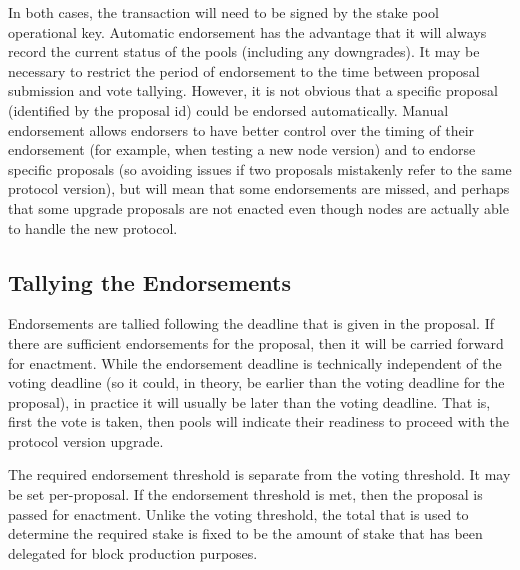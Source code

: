 In both cases, the transaction will need to be signed by the stake pool operational key.  Automatic endorsement has the advantage that it will always record the
current status of the pools (including any downgrades).  It may be necessary to restrict the period of endorsement to the time between proposal submission and vote tallying.
However, it is not obvious that a specific proposal (identified by the proposal id) could be endorsed automatically.  Manual endorsement allows endorsers to have better control over the timing of their
endorsement (for example, when testing a new node version) and to endorse specific proposals (so avoiding issues if two proposals mistakenly refer to the same protocol version),
but will mean that some endorsements are missed, and perhaps that some upgrade proposals are not enacted even though nodes are actually able to handle the new protocol.

\subsection{Tallying the Endorsements}

Endorsements are tallied following the deadline that is given in the proposal.  If there are sufficient endorsements for the proposal, then it will be carried forward
for enactment.  While the endorsement deadline is technically independent of the voting deadline (so it could, in theory, be earlier than the voting deadline for the proposal),
in practice it will usually be later than the voting deadline. That is, first the vote is taken, then pools will indicate their readiness to proceed with the protocol version
upgrade.

The required endorsement threshold is separate from the voting threshold.  It may be set per-proposal.  If the endorsement threshold is met, then the proposal is passed
for enactment.  Unlike the voting threshold, the total that is used to determine the required stake is fixed to be the amount of stake that has been delegated for block production purposes.
